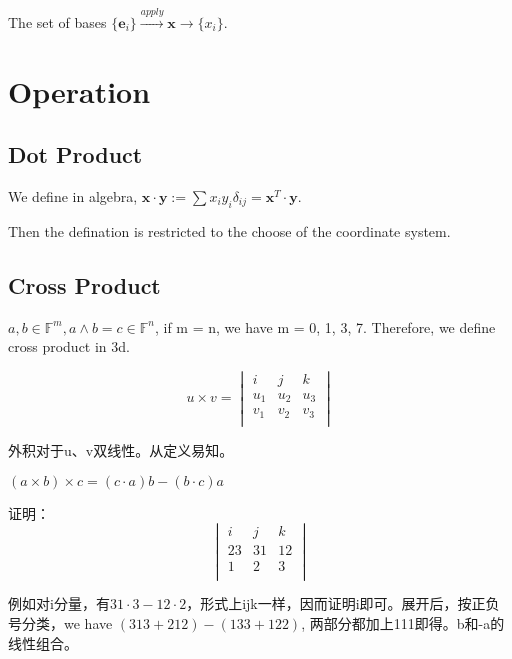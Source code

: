 \documentclass[UTF8]{../../09-Mathematics}
\begin{document}
The set of bases $\{ \boldsymbol e_i  \}  \xrightarrow{apply} \boldsymbol{x} \longrightarrow    \{ x_i \}   $.





\section{Operation}




\subsection{Dot Product}

We define in algebra, $ \boldsymbol{x} \cdot \boldsymbol{y} := \sum{x_iy_i \delta _{ij}} = \boldsymbol{x}^T \cdot \boldsymbol{y}$.

Then the defination is restricted to the choose of the coordinate system. 


\subsection{Cross Product}

$a, b \in \mathbb F^m, a \wedge b = c \in \mathbb F^n $, if m = n, we have m = 0, 1, 3, 7. Therefore, we define cross product in 3d.

\begin{equation}
  u \times  v = 
  \begin{vmatrix}
     i & j & k\\
     u_1 & u_2 & u_3\\
     v_1 & v_2 & v_3\\
  \end{vmatrix}
\end{equation}


\begin{proposition}
  外积对于u、v双线性。从定义易知。
\end{proposition}

\begin{proposition}
  $(a \times b) \times c =  (c \cdot a) b -  (b \cdot c) a   $

  证明：
  \begin{equation}
    \begin{vmatrix}
       i & j & k\\
       23 & 31 & 12\\
       1 & 2 & 3\\
    \end{vmatrix}
  \end{equation}
\end{proposition}
例如对i分量，有$31 \cdot 3-12\cdot2$，形式上ijk一样，因而证明i即可。展开后，按正负号分类，we have $(313+212) - (133+122)$, 两部分都加上111即得。b和-a的线性组合。
\end{document}
